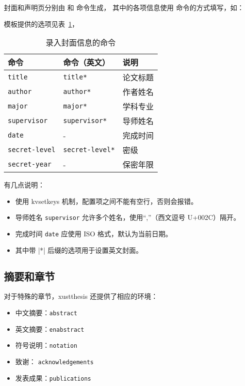 \documentclass[a4paper]{ltxdoc}
\DeclareRobustCommand\env{\texttt}
\DeclareRobustCommand\pkg{\textsf}
\DeclareRobustCommand\cls{\textsf}
\DeclareRobustCommand\opt{\texttt}
\begin{document}
\DescribeMacro{\maketitle}
\DescribeMacro{\copyrightpage}
封面和声明页分别由  和  命令生成，
其中的各项信息使用  命令的方式填写，如：
\begin{latex}
\end{latex}
模板提供的选项见表~\ref{tab:covercmds}，
\begin{table}[htb]
  \centering\small
  \caption{录入封面信息的命令}
  \label{tab:covercmds}
  \begin{tabular}{lll}
    \toprule
    命令                & 命令（英文）         & 说明       \\
    \midrule
    \opt{title}         & \opt{title*}         & 论文标题   \\
    \opt{author}        & \opt{author*}        & 作者姓名   \\
    \opt{major}         & \opt{major*}         & 学科专业   \\
    \opt{supervisor}    & \opt{supervisor*}    & 导师姓名   \\
    \opt{date}          & -                    & 完成时间   \\
    \opt{secret-level}  & \opt{secret-level*}  & 密级       \\
    \opt{secret-year}   & -                    & 保密年限   \\
    \bottomrule
  \end{tabular}
\end{table}

有几点说明：
\begin{itemize}
  \item {} 使用 \pkg{kvsetkeys} 机制，配置项之间不能有空行，否则会报错。
  \item 导师姓名 \opt{supervisor} 允许多个姓名，使用“,”（西文逗号 U+002C）隔开。
  \item 完成时间 \opt{date} 应使用 ISO 格式，默认为当前日期。
  \item 其中带 |*| 后缀的选项用于设置英文封面。
\end{itemize}


\subsection{摘要和章节}
对于特殊的章节，\cls{xustthesis} 还提供了相应的环境：
\begin{itemize}
  \item 中文摘要：\env{abstract}
  \item 英文摘要：\env{enabstract}
  \item 符号说明：\env{notation}
  \item 致谢：    \env{acknowledgements}
  \item 发表成果：\env{publications}
\end{itemize}
\end{document}
